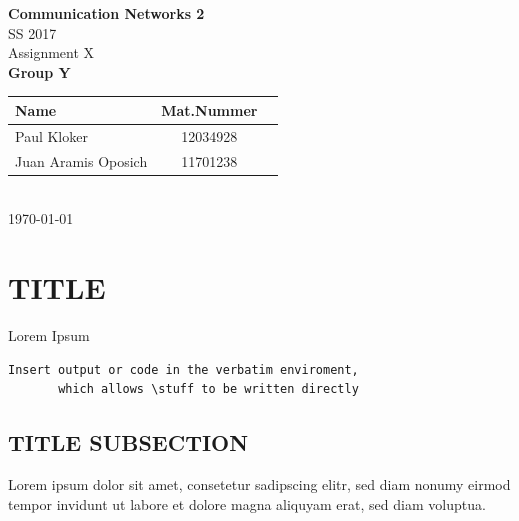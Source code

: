 \documentclass[parskip=full]{scrartcl}
\begin{document}
\begin{titlepage}
    \centering
    \vspace*{2cm}
    {\Huge \textbf{Communication Networks 2}}\\
    SS 2017\\
    \vspace*{1cm}
    {\Large Assignment X}
    \\\vspace*{3cm}
    {\Large \textbf{Group Y}}\\
    \vspace*{1cm}
    {\large 
        \begin{tabular}{l c c}
            Name & Mat.Nummer \\ \hline
            Paul Kloker & 12034928 \\
            Juan Aramis Oposich & 11701238
        \end{tabular}
    }
    \\\vspace*{7cm}
    \today
\end{titlepage}

\section{TITLE}

Lorem Ipsum

\begin{verbatim}
Insert output or code in the verbatim enviroment,
       which allows \stuff to be written directly
\end{verbatim}

\subsection{TITLE SUBSECTION}
Lorem ipsum dolor sit amet, consetetur sadipscing elitr, sed diam nonumy eirmod tempor invidunt ut labore et dolore magna aliquyam erat, sed diam voluptua.

\end{document}
